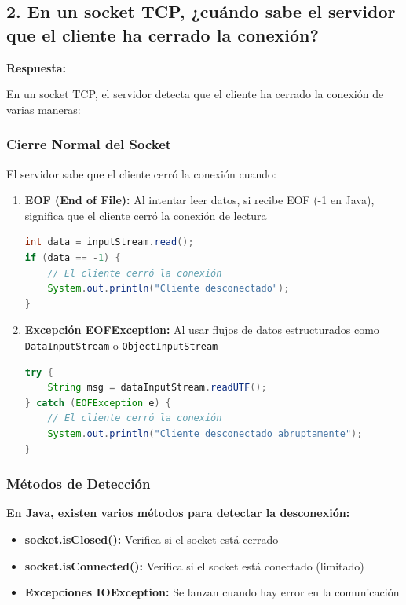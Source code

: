 \documentclass{article}
\begin{document}
\subsection{2. En un socket TCP, ¿cuándo sabe el servidor que el cliente ha cerrado la conexión?}

\textbf{Respuesta:}

En un socket TCP, el servidor detecta que el cliente ha cerrado la conexión de varias maneras:

\subsubsection{Cierre Normal del Socket}

El servidor sabe que el cliente cerró la conexión cuando:
\begin{enumerate}
    \item \textbf{EOF (End of File):} Al intentar leer datos, si recibe EOF (-1 en Java), significa que el cliente cerró la conexión de lectura
    \begin{lstlisting}[language=Java, numbers=none]
int data = inputStream.read();
if (data == -1) {
    // El cliente cerró la conexión
    System.out.println("Cliente desconectado");
}
    \end{lstlisting}
    
    \item \textbf{Excepción EOFException:} Al usar flujos de datos estructurados como \texttt{DataInputStream} o \texttt{ObjectInputStream}
    \begin{lstlisting}[language=Java, numbers=none]
try {
    String msg = dataInputStream.readUTF();
} catch (EOFException e) {
    // El cliente cerró la conexión
    System.out.println("Cliente desconectado abruptamente");
}
    \end{lstlisting}
\end{enumerate}

\subsubsection{Métodos de Detección}

\textbf{En Java, existen varios métodos para detectar la desconexión:}

\begin{itemize}
    \item \textbf{socket.isClosed():} Verifica si el socket está cerrado
    \item \textbf{socket.isConnected():} Verifica si el socket está conectado (limitado)
    \item \textbf{Excepciones IOException:} Se lanzan cuando hay error en la comunicación
\end{itemize}
\end{document}
